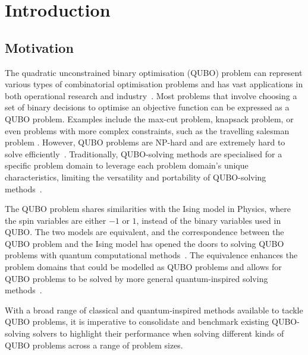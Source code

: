 
\chapter{Introduction}
\vspace{2em}

\section{Motivation}
The quadratic unconstrained binary optimisation (QUBO) problem can represent various types of combinatorial optimisation problems and has vast applications in both operational research and industry~\cite{b1}. Most problems that involve choosing a set of binary decisions to optimise an objective function can be expressed as a QUBO problem. Examples include the max-cut problem, knapsack problem, or even problems with more complex constraints, such as the travelling salesman problem \cite{b10}. However, QUBO problems are NP-hard and are extremely hard to solve efficiently~\cite{barahona1982computational,b1}. Traditionally, QUBO-solving methods are specialised for a specific problem domain to leverage each problem domain's unique characteristics, limiting the versatility and portability of QUBO-solving methods~\cite{b5}.

The QUBO problem shares similarities with the Ising model in Physics, where the spin variables are either $-1$ or $1$, instead of the binary variables used in QUBO. The two models are equivalent, and the correspondence between the QUBO problem and the Ising model has opened the doors to solving QUBO problems with quantum computational methods~\cite{b5}. The equivalence enhances the problem domains that could be modelled as QUBO problems and allows for QUBO problems to be solved by more general quantum-inspired solving methods~\cite{b5}.

With a broad range of classical and quantum-inspired methods available to tackle QUBO problems, it is imperative to consolidate and benchmark existing QUBO-solving solvers to highlight their performance when solving different kinds of QUBO problems across a range of problem sizes.

